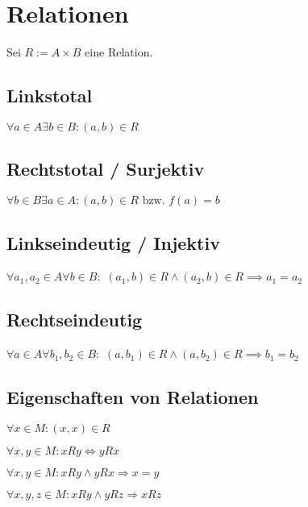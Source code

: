 \section*{Relationen}

Sei $R := A \times B$ eine Relation.

\subsection*{Linkstotal}

$\forall a \in A \exists b \in B : (a,b)  \in R$

\subsection*{Rechtstotal / Surjektiv}

$\forall b \in B \exists a \in A : (a,b) \in R \text{ bzw. } f(a)=b$

\subsection*{Linkseindeutig / Injektiv}

$\forall a_1, a_2 \in A \forall b \in B :$ \newline
\hspace*{5mm} $(a_1,b) \in R \land (a_2,b) \in R \implies a_1=a_2$

\subsection*{Rechtseindeutig}

$\forall a \in A \forall b_1, b_2 \in B:$ \newline
\hspace*{5mm} $(a,b_1) \in R \land (a,b_2) \in R \implies b_1=b_2$

\subsection*{Eigenschaften von Relationen}

\begin{description}[leftmargin=!,labelwidth=25mm]
	\item[reflexiv] $\forall x \in M : (x, x) \in R$
	\item[symmetrisch] $\forall x, y \in M : xRy \Leftrightarrow yRx$
	\item[antisymmetrisch] $\forall x, y \in M : xRy \land yRx \Rightarrow x=y$
	\item[transitiv] $\forall x, y, z \in M : xRy \land yRz \Rightarrow xRz$
\end{description}

